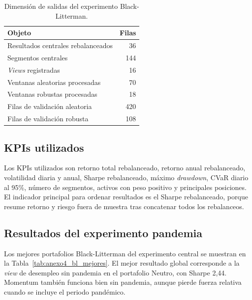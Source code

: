 \begin{table}[H]
\centering
\caption{Dimensi\'on de salidas del experimento Black-Litterman.}
\label{tab:anexo4_bl_salidas}
\small
\begin{tabular}{@{}lr@{}}
\toprule
Objeto & Filas \\
\midrule
Resultados centrales rebalanceados & 36 \\
Segmentos centrales & 144 \\
\textit{Views} registradas & 16 \\
Ventanas aleatorias procesadas & 70 \\
Ventanas robustas procesadas & 18 \\
Filas de validaci\'on aleatoria & 420 \\
Filas de validaci\'on robusta & 108 \\
\bottomrule
\end{tabular}
\end{table}

\subsection*{KPIs utilizados}

Los KPIs utilizados son retorno total rebalanceado, retorno anual rebalanceado,
volatilidad diaria y anual, Sharpe rebalanceado, m\'aximo \textit{drawdown},
CVaR diario al 95\%, n\'umero de segmentos, activos con peso positivo y
principales posiciones. El indicador principal para ordenar resultados es el
Sharpe rebalanceado, porque resume retorno y riesgo fuera de muestra tras
concatenar todos los rebalanceos.

\subsection*{Resultados del experimento pandemia}

Los mejores portafolios Black-Litterman del experimento central se muestran en
la Tabla~\ref{tab:anexo4_bl_mejores}. El mejor resultado global corresponde a
la \textit{view} de desempleo sin pandemia en el portafolio Neutro, con Sharpe
2,44. Momentum tambi\'en funciona bien sin pandemia, aunque pierde fuerza
relativa cuando se incluye el periodo pand\'emico.

